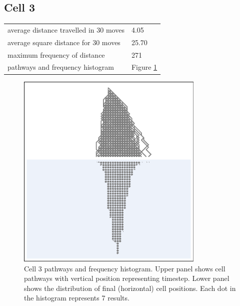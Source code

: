 \documentclass[11pt,a4paper]{article}
\newcommand \bt{\begin{longtable}{p{0.65\textwidth}p{0.25\textwidth}}}
\newcommand \et{\end{longtable}}
\begin{document}
\subsection*{Cell 3}
\bt
average distance travelled in 30 moves &  4.05\\
average square distance for 30 moves & 25.70\\
maximum frequency of distance & 271\\
pathways and frequency histogram & Figure \ref{fig3}
\et
\begin{figure}[htbp]
\begin{center}
\includegraphics[width=0.8\textwidth]{CA30_R40L40_3.eps}
\caption{Cell 3 pathways and frequency histogram. Upper panel shows cell pathways with vertical position representing timestep. 
Lower panel shows the distribution of final (horizontal) cell positions. Each dot in the histogram represents 7 results.}
\label{fig3}
\end{center}
\end{figure}
\end{document}
